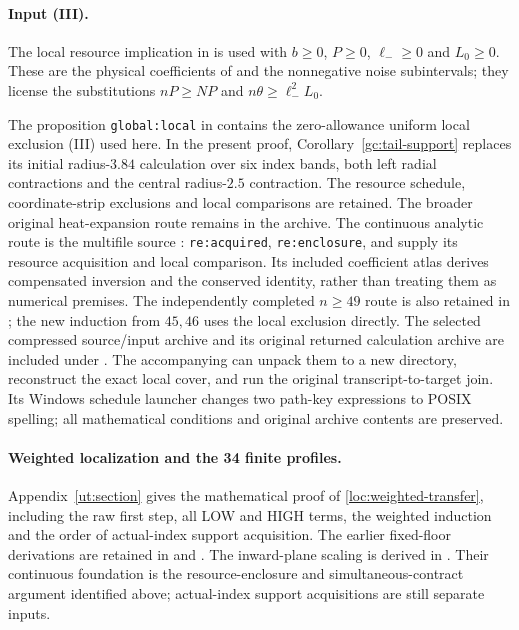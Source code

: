 \paragraph{Input (III).}
The local resource implication  in
 is used with $b\ge0$, $P\ge0$,
$\ell_-\ge0$ and $L_0\ge0$. These are the physical coefficients of
 and the nonnegative noise subintervals; they license
the substitutions $nP\ge NP$ and $n\theta\ge\ell_-^2L_0$.

The proposition \texttt{global:local} in
contains the zero-allowance uniform local exclusion (III) used here.
In the present proof, Corollary~\ref{gc:tail-support} replaces its
initial radius-$3.84$ calculation over six index bands, both left radial
contractions and the central radius-$2.5$ contraction. The resource
schedule, coordinate-strip exclusions and local comparisons are
retained. The broader original heat-expansion route remains in the archive.
The continuous analytic route is the multifile source
:
\texttt{re:acquired}, \texttt{re:enclosure}, and
 supply its resource acquisition and
local comparison. Its included coefficient atlas derives
compensated inversion and the conserved identity, rather than treating
them as numerical premises. The independently completed $n\ge49$
route is also retained in
;
the new induction from $45,46$ uses the local exclusion directly.
The selected compressed source/input archive and its original returned
calculation archive are included under .
The accompanying  can unpack
them to a new directory, reconstruct the exact local cover, and run
the original transcript-to-target join. Its Windows schedule launcher
changes two path-key expressions to POSIX spelling; all mathematical
conditions and original archive contents are preserved.

\paragraph{Weighted localization and the 34 finite profiles.}
Appendix~\ref{ut:section} gives the mathematical proof of
\eqref{loc:weighted-transfer}, including the raw first step, all LOW and
HIGH terms, the weighted induction and the order of actual-index support
acquisition. The earlier fixed-floor derivations are retained in
and
.
The inward-plane scaling is derived in
.
Their continuous foundation is the resource-enclosure and simultaneous-contract
argument identified above; actual-index support acquisitions are still
separate inputs.

